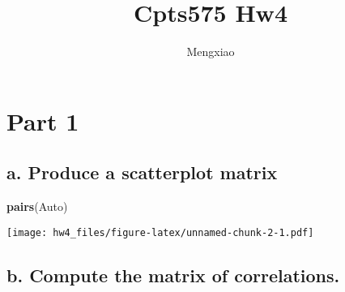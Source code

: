 \documentclass[]{article}
\title{Cpts575 Hw4}
\author{Mengxiao}
\date{}
\newenvironment{Shaded}{\begin{snugshade}}{\end{snugshade}}
\newcommand{\CommentTok}[1]{\textcolor[rgb]{0.56,0.35,0.01}{\textit{#1}}}
\newcommand{\DataTypeTok}[1]{\textcolor[rgb]{0.13,0.29,0.53}{#1}}
\newcommand{\KeywordTok}[1]{\textcolor[rgb]{0.13,0.29,0.53}{\textbf{#1}}}
\newcommand{\NormalTok}[1]{#1}
\newcommand{\OperatorTok}[1]{\textcolor[rgb]{0.81,0.36,0.00}{\textbf{#1}}}
\newcommand{\StringTok}[1]{\textcolor[rgb]{0.31,0.60,0.02}{#1}}
\begin{document}
\maketitle

\hypertarget{part-1}{%
\section{Part 1}\label{part-1}}

\begin{Shaded}
\end{Shaded}

\hypertarget{a.-produce-a-scatterplot-matrix}{%
\subsection{a. Produce a scatterplot
matrix}\label{a.-produce-a-scatterplot-matrix}}

\begin{Shaded}
\begin{Highlighting}[]
\KeywordTok{pairs}\NormalTok{(Auto)}
\end{Highlighting}
\end{Shaded}

\texttt{[image: hw4\_files/figure-latex/unnamed-chunk-2-1.pdf]}

\hypertarget{b.-compute-the-matrix-of-correlations.}{%
\subsection{b. Compute the matrix of
correlations.}\label{b.-compute-the-matrix-of-correlations.}}

\begin{Shaded}
\end{Shaded}
\end{document}
